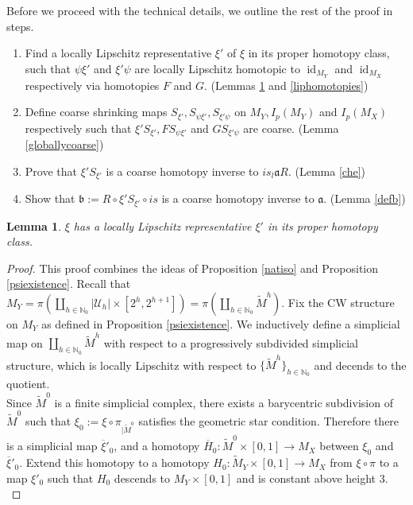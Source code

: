 \documentclass[a4paper,11pt]{article}
\theoremstyle{definition}
\theoremstyle{plain}
\newtheorem{lemma}[definition]{Lemma}
\theoremstyle{remark}
\DeclareMathOperator{\id}{id}
\begin{document}
{Before we proceed with the technical details, we outline the rest of the proof in steps. 

\begin{enumerate}
\item Find a locally Lipschitz representative $\xi'$ of $\xi$ in its proper homotopy class, such that $\psi \xi'$ and $\xi' \psi$ are locally Lipschitz homotopic to $\id_{M_{Y}}$ and $\id_{M_{X}}$ respectively via homotopies $F$ and $G$. (Lemmas \ref{xi'} and \ref{liphomotopies})
\item Define coarse shrinking maps $S_{\xi'}, S_{\psi\xi'}, S_{\xi' \psi}$ on $M_{Y},I_{p}(M_{Y})$ and $I_{p}(M_{X})$ respectively such that $\xi' S_{\xi'}, FS_{\psi\xi'}$ and $GS_{\xi' \psi}$ are coarse. (Lemma \ref{globallycoarse})
\item Prove that $\xi' S_{\xi'}$ is a coarse homotopy inverse to $is_{l}\mathfrak{a}R$. (Lemma \ref{che})
\item Show that $\mathfrak{b}:= R\circ \xi' S_{\xi'} \circ is$ is a coarse homotopy inverse to $\mathfrak{a}$. (Lemma \ref{defb})
\end{enumerate}

\begin{lemma} \label{xi'} $\xi$ has a locally Lipschitz representative $\xi'$ in its proper homotopy class.
\end{lemma}

\begin{proof} This proof combines the ideas of Proposition \ref{natiso} and Proposition \ref{psiexistence}. Recall that $M_{Y} = \pi(\coprod_{h\in \mathbb{N}_{0}} |\mathcal{U}_{h}| \times [2^h,2^{h+1}])=\pi(\coprod_{h\in \mathbb{N}_{0}}\tilde{M}^h)$. Fix the CW structure on $M_{Y}$ as defined in Proposition \ref{psiexistence}. We inductively define a simplicial map on $\coprod_{h\in \mathbb{N}_{0}}\tilde{M}^h$ with respect to a progressively subdivided simplicial structure, which is locally Lipschitz with respect to $\{\tilde{M}^h\}_{h\in \mathbb{N}_{0}}$ and decends to the quotient.\\

Since $\tilde{M}^0$ is a finite simplicial complex, there exists a barycentric subdivision of $\tilde{M}^0$ such that $\xi_{0}:=\xi \circ \pi_{|\tilde{M}^0}$ satisfies the geometric star condition. Therefore there is a simplicial map $\overline{\xi}'_{0}$, and a homotopy $\overline{H}_{0}: \tilde{M}^0 \times [0,1] \rightarrow M_{X}$ between $\xi_{0}$ and $\overline{\xi}'_{0}$. Extend this homotopy to a homotopy $H_{0}: \tilde{M}_{Y} \times [0,1] \rightarrow M_{X}$ from $\xi \circ \pi$ to a map $\xi'_{0}$ such that $H_{0}$ descends to $M_{Y} \times [0,1]$ and is constant above height $3$.\\


\end{proof}}
\end{document}
